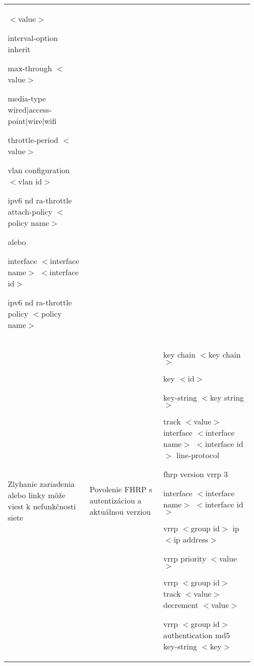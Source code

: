 \begin{longtable}[!htbp]{|L{10em}L{10em}>{\selectfont}L{34em}|}
	\hspace{0.5em}$<$value$>$
	
	\hspace{0.5em}interval-option inherit
	
	\hspace{0.5em}max-through $<$value$>$
	
	\hspace{0.5em}media-type wired|access-point|wire|wifi
	
	\hspace{0.5em}throttle-period $<$value$>$
	
	vlan configuration $<$vlan id$>$
	
	\hspace{0.5em}ipv6 nd ra-throttle attach-policy $<$policy name$>$
	
	\vspace{0.5em}
	{\selectfont alebo }
	\vspace{0.5em}
	
	interface $<$interface name$>$ $<$interface id$>$
	
	\hspace{0.5em}ipv6 nd ra-throttle policy $<$policy name$>$\\
	
	
	
	
	Zlyhanie zariadenia alebo linky môže viest k nefunkčnosti siete 	&Povolenie FHRP s autentizáciou a aktuálnou verziou	&key chain $<$key chain$>$
	
	\hspace{0.5em}key $<$id$>$
	
	\hspace{1em}key-string $<$key string$>$
	
	track $<$value$>$ interface $<$interface name$>$ $<$interface id$>$ line-protocol
	
	fhrp version vrrp 3
	
	interface $<$interface name$>$ $<$interface id$>$
	
	\hspace{0.5em}vrrp $<$group id$>$ ip $<$ip  address$>$
	
	\hspace{0.5em}vrrp priority $<$value$>$
	
	\hspace{0.5em}vrrp $<$group id$>$ track $<$value$>$ decrement $<$value$>$
	
	\hspace{0.5em}vrrp $<$group id$>$ authentication md5 key-string $<$key$>$
	

\end{longtable}
